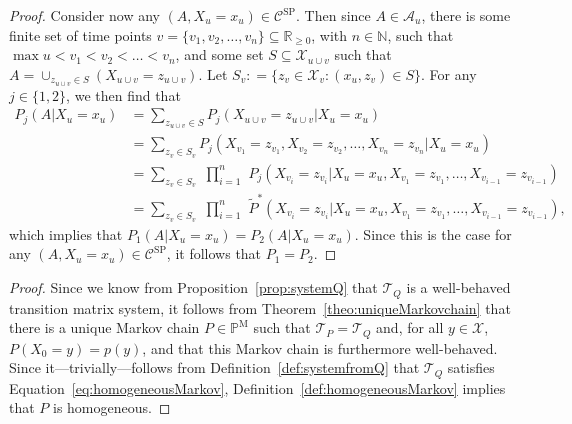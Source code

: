 \documentclass[10pt,a4paper]{paper}
\theoremstyle{definition}
\newcommand{\nats}{\mathbb{N}}
\newcommand{\reals}{\mathbb{R}}
\newcommand{\states}{\mathcal{X}}
\newcommand{\processes}{\mathbb{P}}
\newcommand{\mprocesses}{\processes^{\mathrm{M}}}
\newcommand{\coloneqq}{:\!=}
\begin{document}
\begin{proof}
Consider now any $(A,X_u=x_u)\in\mathcal{C}^\mathrm{SP}$. Then since $A\in\mathcal{A}_u$, there is some finite set of time points $v=\{v_1,v_2,\dots,v_n\}\subseteq\reals_{\geq0}$, with $n\in\nats$, such that $\max u<v_1<v_2<\dots<v_n$, and some set $S\subseteq\states_{u\cup v}$ such that $A=\cup_{z_{u\cup v}\in S}(X_{u\cup v}=z_{u\cup v})$. 
Let $S_v\coloneqq\{z_v\in\states_v\colon (x_u,z_v)\in S\}$.
For any $j\in\{1,2\}$, we then find that
\begin{align*}
P_j(A\vert X_u=x_u)
&=\sum_{z_{u\cup v}\in S}
P_j(X_{u\cup v}=z_{u\cup v}\vert X_u=x_u)\\
&=\sum_{z_{v}\in S_v}
P_j(X_{v_1}=z_{v_1}, X_{v_2}=z_{v_2}, \dots, X_{v_n}=z_{v_n}\vert X_u=x_u)\\[-1mm]
&=\sum_{z_{v}\in S_v}
\,\,
\prod_{i=1}^n
\,\,
P_j(X_{v_i}=z_{v_i}\vert X_u=x_u, X_{v_1}=z_{v_1}, \dots, X_{v_{i-1}}=z_{v_{i-1}})\\
&=\sum_{z_{v}\in S_v}
\,\,
\prod_{i=1}^n
\,\,
\tilde{P}^*(X_{v_i}=z_{v_i}\vert X_u=x_u, X_{v_1}=z_{v_1}, \dots, X_{v_{i-1}}=z_{v_{i-1}}),
\end{align*}
which implies that $P_1(A\vert X_u=x_u)=P_2(A\vert X_u=x_u)$. Since this is the case for any $(A,X_u=x_u)\in\mathcal{C}^\mathrm{SP}$, it follows that $P_1=P_2$.
\end{proof}

\corratehasuniquehomogenmarkovprocess*
\begin{proof}
Since we know from Proposition~\ref{prop:systemQ} that $\mathcal{T}_Q$ is a well-behaved transition matrix system, it follows from Theorem~\ref{theo:uniqueMarkovchain} that there is a unique Markov chain $P\in\mprocesses$ such that $\mathcal{T}_P=\mathcal{T}_Q$ and, for all $y\in\mathcal{X}$, $P(X_0=y)=p(y)$, and that this Markov chain is furthermore well-behaved. Since it---trivially---follows from Definition~\ref{def:systemfromQ} that $\mathcal{T}_Q$ satisfies Equation~\eqref{eq:homogeneousMarkov}, Definition~\ref{def:homogeneousMarkov} implies that $P$ is homogeneous.
\end{proof}
\end{document}

